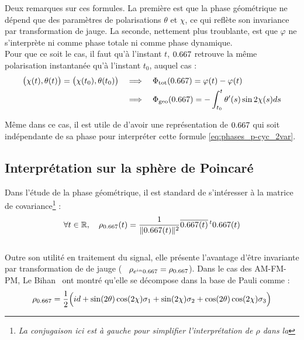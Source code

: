 Deux remarques sur ces formules. 
La première est que la phase géométrique ne dépend que des paramètres de polarisations $\theta$ et $\chi$, ce qui reflète son invariance par transformation de jauge.
La seconde, nettement plus troublante, est que $\varphi$ ne s'interprète ni comme phase totale ni comme phase dynamique. 
\\
Pour que ce soit le cas, il faut qu'à l'instant $t$, $\x $ retrouve la même polarisation instantanée qu'à l'instant $t_0$, auquel cas :
\begin{equation}\label{eq:phases_p-cyc_2var}
	\begin{aligned}
		\big( \chi(t), \theta(t) \big) = \big( \chi(t_0), \theta(t_0) \big)\quad 
		&\Lr\quad \phaset(\x ) = \varphi(t) - \varphi(t) \\
		&\Lr\quad \phaseg(\x ) = -\int_{t_0}^t \theta'(s) \sin 2\chi(s) ds
	\end{aligned}
\end{equation}
\skipl

Même dans ce cas, il est utile de d'avoir une représentation de $\x $ qui soit indépendante de sa phase pour interpréter cette formule \eqref{eq:phases_p-cyc_2var}.
\\



\subsection{Interprétation sur la sphère de Poincaré}\label{subsec:phase_g2Poincare}

Dans l'étude de la phase géométrique, il est standard de s'intéresser à la matrice de covariance\footnote{\itshape
	La conjugaison ici est à gauche pour simplifier l'interprétation de $\rho$ dans la 
} :
\begin{equation} \label{eq:proj2x_2var}
	\forall t\in\R,\quad \rho_{\x}(t) = \frac{1}{\|\x(t) \|^2} \congu{\x(t) }\, ^t\x(t)
\end{equation}
\\
Outre son utilité en traitement du signal, elle présente l'avantage d'être invariante par transformation de de jauge (\ie~ $\rho_{e^{i\alpha}\x} = \rho_{\x}$).
Dans le cas des AM-FM-PM, Le Bihan \etal~ont montré qu'elle se décompose dans la base de Pauli comme :
\begin{equation} \label{eq:decompo_pauli}
	\rho_{\x} = \frac{1}{2}\Big( id + \sin(2\theta) \cos(2\chi) \sigma_1 + \sin (2\chi) \sigma_2 + \cos(2\theta) \cos(2\chi) \sigma_3 \Big)
\end{equation}


